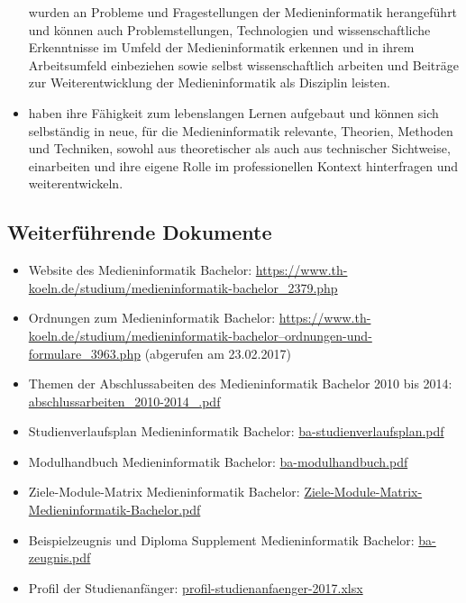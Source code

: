\begin{itemize}
  wurden an Probleme und Fragestellungen der Medieninformatik
  herangeführt und können auch Problemstellungen, Technologien und
  wissenschaftliche Erkenntnisse im Umfeld der Medieninformatik erkennen
  und in ihrem Arbeitsumfeld einbeziehen sowie selbst wissenschaftlich
  arbeiten und Beiträge zur Weiterentwicklung der Medieninformatik als
  Disziplin leisten.
\item
  haben ihre Fähigkeit zum lebenslangen Lernen aufgebaut und können sich
  selbständig in neue, für die Medieninformatik relevante, Theorien,
  Methoden und Techniken, sowohl aus theoretischer als auch aus
  technischer Sichtweise, einarbeiten und ihre eigene Rolle im
  professionellen Kontext hinterfragen und weiterentwickeln.
\end{itemize}

\subsection{Weiterführende
Dokumente}\label{weiterfuxfchrende-dokumente}

\begin{itemize}
\tightlist
\item
  Website des Medieninformatik Bachelor:
  \url{https://www.th-koeln.de/studium/medieninformatik-bachelor_2379.php}
\item
  Ordnungen zum Medieninformatik Bachelor:
  \href{https://www.th-koeln.de/studium/medieninformatik-bachelor--ordnungen-und-formulare_3963.php}{https://www.th-koeln.de/studium/medieninformatik-bachelor--ordnungen-und-formulare\_3963.php}
  (abgerufen am 23.02.2017)
\item
  Themen der Abschlussabeiten des Medieninformatik Bachelor 2010 bis
  2014:
  \href{../anhaenge/abschlussarbeiten_2010-2014_.pdf}{abschlussarbeiten\_2010-2014\_.pdf}
\item
  Studienverlaufsplan Medieninformatik Bachelor:
  \href{../anhaenge/ba-studienverlaufsplan.pdf}{ba-studienverlaufsplan.pdf}
\item
  Modulhandbuch Medieninformatik Bachelor:
  \href{../anhaenge/ba-modulhandbuch.pdf}{ba-modulhandbuch.pdf}
\item
  Ziele-Module-Matrix Medieninformatik Bachelor:
  \href{../anhaenge/Ziele-Module-Matrix-Medieninformatik-Bachelor.pdf}{Ziele-Module-Matrix-Medieninformatik-Bachelor.pdf}
\item
  Beispielzeugnis und Diploma Supplement Medieninformatik Bachelor:
  \href{../anhaenge/ba-zeugnis.pdf}{ba-zeugnis.pdf}
\item
  Profil der Studienanfänger:
  \href{../anhaenge/profil-studienanfaenger-2017.xlsx}{profil-studienanfaenger-2017.xlsx}
\end{itemize}

